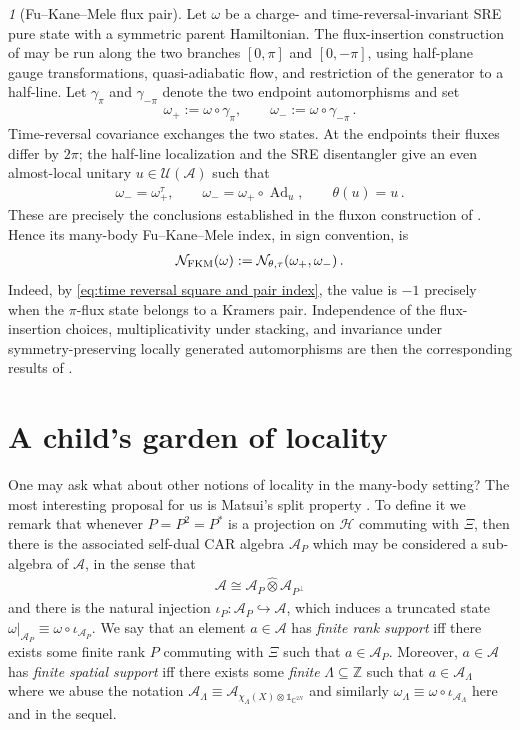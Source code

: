 \documentclass[a4paper,10pt]{article}
\numberwithin{equation}{section}
\theoremstyle{plain}
\theoremstyle{plain}
\theoremstyle{plain}
\theoremstyle{plain}
\theoremstyle{plain}
\theoremstyle{remark}
\newtheorem{rem}[rem]{\protect\remarkname}
\theoremstyle{definition}
\providecommand{\remarkname}{Remark}
\newcommand{\ZZ}{\mathbb{Z}}
\newcommand{\CC}{\mathbb{C}}
\newcommand{\calA}{\mathcal{A}}
\newcommand{\calN}{\mathcal{N}}
\newcommand{\calU}{\mathcal{U}}
\newcommand{\calH}{\mathcal{H}}
\newcommand{\Ad}[1]{\operatorname{Ad}_{#1}}
\newcommand{\Id}{\mathds{1}}
\newcommand{\eq}[1]{\begin{align*}#1\end{align*}}
\newcommand{\eql}[1]{\begin{align}#1\end{align}}
\begin{document}
\begin{rem}[Fu--Kane--Mele flux pair]
Let $\omega$ be a charge- and time-reversal-invariant SRE pure state
with a symmetric parent Hamiltonian. The flux-insertion construction
of \cite{BachmannShapiroTauber2026} may be run along the two branches
$[0,\pi]$ and $[0,-\pi]$, using half-plane gauge transformations,
quasi-adiabatic flow, and restriction of the generator to a half-line.
Let $\gamma_{\pi}$ and $\gamma_{-\pi}$ denote the two endpoint
automorphisms and set
\eql{
    \omega_+
    :=
    \omega\circ\gamma_{\pi},
    \qquad
    \omega_-
    :=
    \omega\circ\gamma_{-\pi}
    \label{eq:plus minus pi flux states}\,.
}
Time-reversal covariance exchanges the two states. At the endpoints
their fluxes differ by $2\pi$; the half-line localization and the SRE
disentangler give an even almost-local unitary $u\in\calU(\calA)$ such
that
\eql{
    \omega_- = \omega_+^\tau,
    \qquad
    \omega_- = \omega_+\circ\Ad{u},
    \qquad
    \theta(u)=u
    \label{eq:FKM admissible time reversal pair}\,.
}
These are precisely the conclusions established in the fluxon
construction of \cite{BachmannBolsRahnama2024ManyBodyFKM}. Hence its
many-body Fu--Kane--Mele index, in sign convention, is
\eql{
    \calN_{\rm FKM}(\omega)
    :=
    \calN_{\theta,\tau}(\omega_+,\omega_-)
    \label{eq:many body FKM as pair index}\,.
}
Indeed, by \cref{eq:time reversal square and pair index}, the value is
$-1$ precisely when the $\pi$-flux state belongs to a Kramers pair.
Independence of the flux-insertion choices, multiplicativity under
stacking, and invariance under symmetry-preserving locally generated
automorphisms are then the corresponding results of
\cite{BachmannBolsRahnama2024ManyBodyFKM}.
\end{rem}

\section{A child's garden of locality}
\label{sec:a childs garden of locality}
One may ask what about other notions of locality in the many-body setting? The most interesting proposal for us is Matsui's split property \cite{Matsui2013Split}. To define it we remark that whenever $P=P^2=P^\ast$ is a projection on $\calH$ commuting with $\Xi$, then there is the associated self-dual CAR algebra $\calA_P$ which may be considered a sub-algebra of $\calA$, in the sense that \eq{
\calA \cong \calA_P \hat{\otimes}\calA_{P^\perp}
} and there is the natural injection $\iota_P:\calA_P\hookrightarrow\calA$, which induces a truncated state $\left.\omega\right|_{\calA_P}\equiv\omega\circ\iota_{\calA_P}$. We say that an element $a\in\calA$ has \emph{finite rank support} iff there exists some finite rank $P$ commuting with $\Xi$ such that $a\in\calA_P$. Moreover, $a\in\calA$ has \emph{finite spatial support} iff there exists some \emph{finite} $\Lambda\subseteq\ZZ$ such that $a\in\calA_{\Lambda}$ where we abuse the notation $\calA_\Lambda\equiv\calA_{\chi_{\Lambda}(X)\otimes\Id_{\CC^{2N}}}$ and similarly $\omega_\Lambda\equiv\omega\circ\iota_{\calA_{\Lambda}}$ here and in the sequel.
\end{document}

